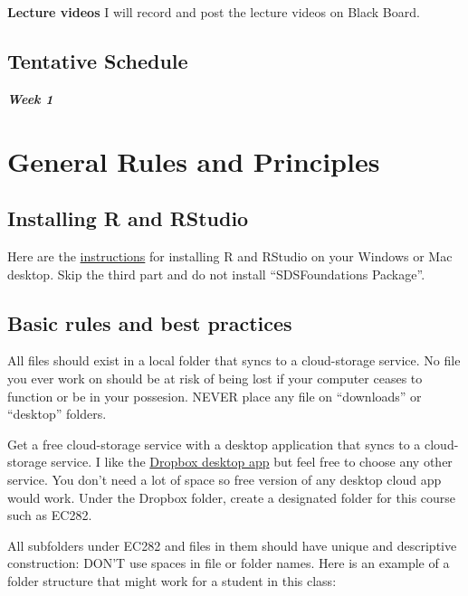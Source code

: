\documentclass[
]{book}
\begin{document}
\textbf{Lecture videos}
I will record and post the lecture videos on Black Board.

\hypertarget{tentative-schedule}{%
\section*{Tentative Schedule}\label{tentative-schedule}}

\textbf{\emph{Week 1}}

\hypertarget{general-rules-and-principles}{%
\chapter{General Rules and Principles}\label{general-rules-and-principles}}

\hypertarget{installing-r-and-rstudio}{%
\section{Installing R and RStudio}\label{installing-r-and-rstudio}}

Here are the \href{https://courses.edx.org/courses/UTAustinX/UT.7.01x/3T2014/56c5437b88fa43cf828bff5371c6a924/}{instructions} for installing R and RStudio on your Windows or Mac desktop. Skip the third part and do not install ``SDSFoundations Package''.

\hypertarget{basic-rules-and-best-practices}{%
\section{Basic rules and best practices}\label{basic-rules-and-best-practices}}

All files should exist in a local folder that syncs to a cloud-storage service. No file you ever work on should be at risk of being lost if your computer ceases to function or be in your possesion. NEVER place any file on ``downloads'' or ``desktop'' folders.

Get a free cloud-storage service with a desktop application that syncs to a cloud-storage service. I like the \href{https://help.dropbox.com/installs-integrations/desktop/desktop-application-overview}{Dropbox desktop app} but feel free to choose any other service. You don't need a lot of space so free version of any desktop cloud app would work. Under the Dropbox folder, create a designated folder for this course such as EC282.

All subfolders under EC282 and files in them should have unique and descriptive construction: DON'T use spaces in file or folder names. Here is an example of a folder structure that might work for a student in this class:
\end{document}
